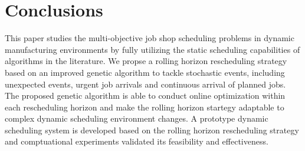 \section{Conclusions}
This paper studies the multi-objective job shop scheduling problems in dynamic manufacturing environments by fully utilizing the static scheduling capabilities of algorithms in the literature.
We propse a rolling horizon rescheduling strategy based on an improved genetic algorithm to tackle stochastic events, including unexpected events, urgent job arrivals and continuous arrival of planned jobs.
The proposed genetic algorithm is able to conduct online optimization within each rescheduling horizon and make the rolling horizon startegy adaptable to complex dynamic scheduling environment changes.
A prototype dynamic scheduling system is developed based on the rolling horizon rescheduling strategy and comptuational experiments validated its feasibility and effectiveness. 